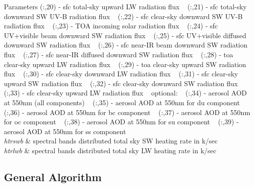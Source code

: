 \begin{DoxyParams}{Parameters}
 (\+:,20) -\/ sfc total-\/sky upward LW radiation flux ~\newline
 (\+:,21) -\/ sfc total-\/sky downward SW U\+V-\/B radiation flux ~\newline
 (\+:,22) -\/ sfc clear-\/sky downward SW U\+V-\/B radiation flux ~\newline
 (\+:,23) -\/ T\+OA incoming solar radiation flux ~\newline
 (\+:,24) -\/ sfc U\+V+visible beam downward SW radiation flux ~\newline
 (\+:,25) -\/ sfc U\+V+visible diffused downward SW radiation flux ~\newline
 (\+:,26) -\/ sfc near-\/\+IR beam downward SW radiation flux ~\newline
 (\+:,27) -\/ sfc near-\/\+IR diffused downward SW radiation flux ~\newline
 (\+:,28) -\/ toa clear-\/sky upward LW radiation flux ~\newline
 (\+:,29) -\/ toa clear-\/sky upward SW radiation flux ~\newline
 (\+:,30) -\/ sfc clear-\/sky downward LW radiation flux ~\newline
 (\+:,31) -\/ sfc clear-\/sky upward SW radiation flux ~\newline
 (\+:,32) -\/ sfc clear-\/sky downward SW radiation flux ~\newline
 (\+:,33) -\/ sfc clear-\/sky upward LW radiation flux ~\newline
 optional\+: ~\newline
 (\+:,34) -\/ aerosol A\+OD at 550nm (all components) ~\newline
 (\+:,35) -\/ aerosol A\+OD at 550nm for du component ~\newline
 (\+:,36) -\/ aerosol A\+OD at 550nm for bc component ~\newline
 (\+:,37) -\/ aerosol A\+OD at 550nm for oc component ~\newline
 (\+:,38) -\/ aerosol A\+OD at 550nm for su component ~\newline
 (\+:,39) -\/ aerosol A\+OD at 550nm for ss component \\
\hline
{\em htrswb} & spectral bands distributed total sky SW heating rate in k/sec \\
\hline
{\em htrlwb} & spectral bands distributed total sky LW heating rate in k/sec\\
\hline
\end{DoxyParams}
\hypertarget{group__module__radiation__driver_gen_grrad}{}\subsection{General Algorithm}\label{group__module__radiation__driver_gen_grrad}


